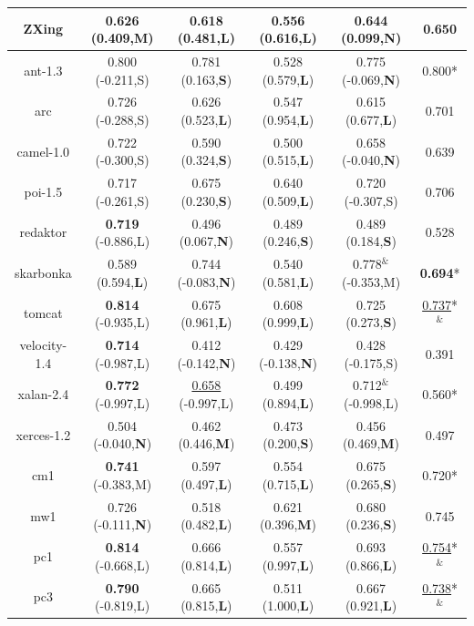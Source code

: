 \begin{table}[!t]
\begin{tabular}{|c||c|c|c|c||c|}
    ZXing       &0.626 (0.409,{\bf M})  &0.618 (0.481,{\bf L})  &0.556 (0.616,{\bf L})  &0.644 (0.099,{\bf N})  &{\bf 0.650} \\ \hline
    ant-1.3     &0.800 (-0.211,S)       &0.781 (0.163,{\bf S})  &0.528 (0.579,{\bf L})  &0.775 (-0.069,{\bf N}) &0.800* \\ \hline
    arc &0.726 (-0.288,S)       &0.626 (0.523,{\bf L})  &0.547 (0.954,{\bf L})  &0.615 (0.677,{\bf L})  &0.701 \\ \hline
    camel-1.0   &0.722 (-0.300,S)       &0.590 (0.324,{\bf S})  &0.500 (0.515,{\bf L})  &0.658 (-0.040,{\bf N}) &0.639 \\ \hline
    poi-1.5     &0.717 (-0.261,S)       &0.675 (0.230,{\bf S})  &0.640 (0.509,{\bf L})  &0.720 (-0.307,S)       &0.706 \\ \hline
    redaktor    &{\bf 0.719} (-0.886,L) &0.496 (0.067,{\bf N})  &0.489 (0.246,{\bf S})  &0.489 (0.184,{\bf S})  &0.528 \\ \hline
    skarbonka   &0.589 (0.594,{\bf L})  &0.744 (-0.083,{\bf N}) &0.540 (0.581,{\bf L})  &0.778$^{\&}$ (-0.353,M)        &{\bf 0.694}* \\ \hline
    tomcat      &{\bf 0.814} (-0.935,L) &0.675 (0.961,{\bf L})  &0.608 (0.999,{\bf L})  &0.725 (0.273,{\bf S})  &\underline{0.737}*$^{\&}$ \\ \hline
    velocity-1.4        &{\bf 0.714} (-0.987,L) &0.412 (-0.142,{\bf N}) &0.429 (-0.138,{\bf N}) &0.428 (-0.175,S)       &0.391 \\ \hline
    xalan-2.4   &{\bf 0.772} (-0.997,L) &\underline{0.658} (-0.997,L)   &0.499 (0.894,{\bf L})  &0.712$^{\&}$ (-0.998,L)        &0.560* \\ \hline
    xerces-1.2  &0.504 (-0.040,{\bf N}) &0.462 (0.446,{\bf M})  &0.473 (0.200,{\bf S})  &0.456 (0.469,{\bf M})  &0.497 \\ \hline
    cm1 &{\bf 0.741} (-0.383,M) &0.597 (0.497,{\bf L})  &0.554 (0.715,{\bf L})  &0.675 (0.265,{\bf S})  &0.720* \\ \hline
    mw1 &0.726 (-0.111,{\bf N}) &0.518 (0.482,{\bf L})  &0.621 (0.396,{\bf M})  &0.680 (0.236,{\bf S})  &0.745 \\ \hline
    pc1 &{\bf 0.814} (-0.668,L) &0.666 (0.814,{\bf L})  &0.557 (0.997,{\bf L})  &0.693 (0.866,{\bf L})  &\underline{0.754}*$^{\&}$ \\ \hline
    pc3 &{\bf 0.790} (-0.819,L) &0.665 (0.815,{\bf L})  &0.511 (1.000,{\bf L})  &0.667 (0.921,{\bf L})  &\underline{0.738}*$^{\&}$ \\ \hline

\end{tabular}
\end{table}
